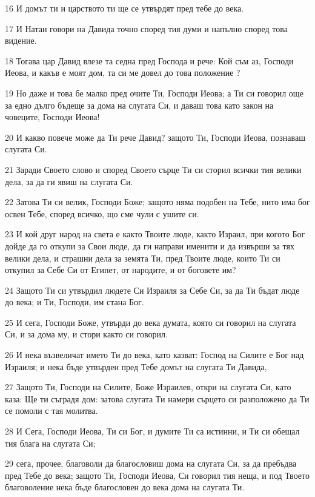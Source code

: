 \par 16 И домът ти и царството ти ще се утвърдят пред тебе до века.
\par 17 И Натан говори на Давида точно според тия думи и напълно според това видение.
\par 18 Тогава цар Давид влезе та седна пред Господа и рече: Кой съм аз, Господи Иеова, и какъв е моят дом, та си ме довел до това положение ?
\par 19 Но даже и това бе малко пред очите Ти, Господи Иеова; а Ти си говорил още за едно дълго бъдеще за дома на слугата Си, и даваш това като закон на човеците, Господи Иеова!
\par 20 И какво повече може да Ти рече Давид? защото Ти, Господи Иеова, познаваш слугата Си.
\par 21 Заради Своето слово и според Своето сърце Ти си сторил всички тия велики дела, за да ги явиш на слугата Си.
\par 22 Затова Ти си велик, Господи Боже; защото няма подобен на Тебе, нито има бог освен Тебе, според всичко, що сме чули с ушите си.
\par 23 И кой друг народ на света е както Твоите люде, както Израил, при когото Бог дойде да го откупи за Свои люде, да ги направи именити и да извърши за тях велики дела, и страшни дела за земята Ти, пред Твоите люде, които Ти си откупил за Себе Си от Египет, от народите, и от боговете им?
\par 24 Защото Ти си утвърдил людете Си Израиля за Себе Си, за да Ти бъдат люде до века; и Ти, Господи, им стана Бог.
\par 25 И сега, Господи Боже, утвърди до века думата, която си говорил на слугата Си, и за дома му, и стори както си говорил.
\par 26 И нека възвеличат името Ти до века, като казват: Господ на Силите е Бог над Израиля; и нека бъде утвърден пред Тебе домът на слугата Ти Давида,
\par 27 Защото Ти, Господи на Силите, Боже Израилев, откри на слугата Си, като каза: Ще ти съградя дом: затова слугата Ти намери сърцето си разположено да Ти се помоли с тая молитва.
\par 28 И Сега, Господи Иеова, Ти си Бог, и думите Ти са истинни, и Ти си обещал тия блага на слугата Си;
\par 29 сега, прочее, благоволи да благословиш дома на слугата Си, за да пребъдва пред Тебе до века; защото Ти, Господи Иеова, Си говорил тия неща, и под Твоето благоволение нека бъде благословен до века дома на слугата Ти.

